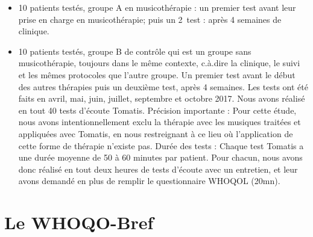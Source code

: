 \begin{itemize}
	\item 10 patients testés, groupe A en musicothérapie : un
          premier test avant leur prise en charge en musicothérapie;
          puis un 2\ieme\ test : après 4 semaines de
          clinique.
	\item 10 patients testés, groupe B de contrôle qui est un groupe sans musicothérapie,
	toujours dans le même contexte, c.à.dire la clinique, le suivi et les mêmes protocoles que l'autre groupe. Un premier test avant
	le début des autres thérapies puis un deuxième test, après 4 semaines. 
	Les tests ont été faits en avril, mai, juin, juillet, septembre et octobre 2017.
	Nous avons réalisé en tout 40 tests d'écoute Tomatis. 
	Précision importante : Pour cette étude, nous avons intentionnellement exclu la thérapie avec les musiques traitées et appliquées avec Tomatis, en nous restreignant  à ce lieu où l'application de cette forme de thérapie n'existe pas.
	Durée des tests : Chaque test Tomatis a une durée  moyenne de 50 à 60  minutes par patient. Pour chacun, nous avons donc réalisé en tout deux heures de tests d'écoute avec un entretien, et leur avons demandé en plus de remplir le questionnaire WHOQOL (20mn).
\end{itemize}

\section{Le WHOQO-Bref}

